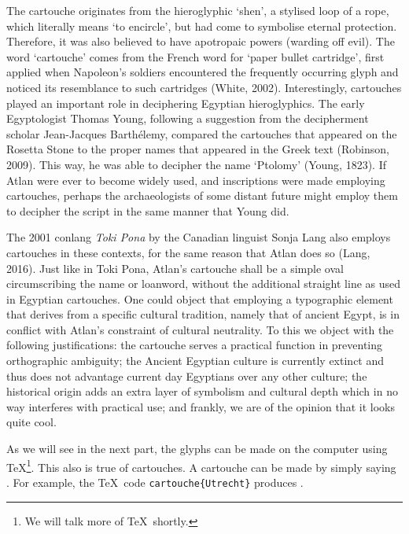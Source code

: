 The cartouche originates from the hieroglyphic ‘shen’, a stylised loop of a rope, which literally means ‘to encircle’, but had come to symbolise eternal protection. Therefore, it was also believed to have apotropaic powers (warding off evil). The word ‘cartouche’ comes from the French word for ‘paper bullet cartridge’, first applied when Napoleon’s soldiers encountered the frequently occurring glyph and noticed its resemblance to such cartridges (White, 2002). Interestingly, cartouches played an important role in deciphering Egyptian hieroglyphics. The early Egyptologist Thomas Young, following a suggestion from the decipherment scholar Jean-Jacques Barthélemy, compared the cartouches that appeared on the Rosetta Stone to the proper names that appeared in the Greek text (Robinson, 2009). This way, he was able to decipher the name ‘Ptolomy’ (Young, 1823). If Atlan were ever to become widely used, and inscriptions were made employing cartouches, perhaps the archaeologists of some distant future might employ them to decipher the script in the same manner that Young did. 

The 2001 conlang {\it Toki Pona} by the Canadian linguist Sonja Lang also employs cartouches in these contexts, for the same reason that Atlan does so (Lang, 2016). Just like in Toki Pona, Atlan’s cartouche shall be a simple oval circumscribing the name or loanword, without the additional straight line as used in Egyptian cartouches. One could object that employing a typographic element that derives from a specific cultural tradition, namely that of ancient Egypt, is in conflict with Atlan’s constraint of cultural neutrality. To this we object with the following justifications: the cartouche serves a practical function in preventing orthographic ambiguity; the Ancient Egyptian culture is currently extinct and thus does not advantage current day Egyptians over any other culture; the historical origin adds an extra layer of symbolism and cultural depth which in no way interferes with practical use; and frankly, we are of the opinion that it looks quite cool. 

As we will see in the next part, the glyphs can be made on the computer using \TeX{}\footnote{We will talk more of \TeX{}\ shortly.}. This also is true of cartouches. A cartouche can be made by simply saying \cartouche{}. For example, the \TeX{}\ code  {\tt {}cartouche\{Utrecht\}} produces \cartouche{}\footnotemark.

